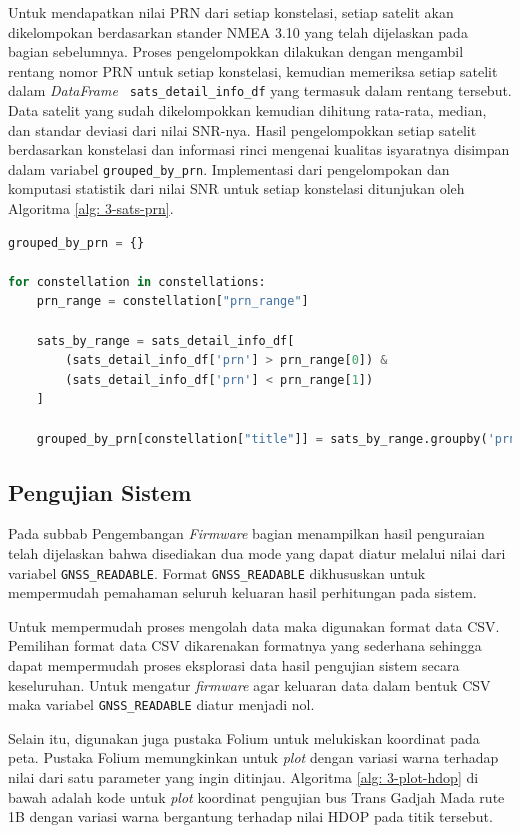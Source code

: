 Untuk mendapatkan nilai PRN dari setiap konstelasi, setiap satelit akan dikelompokan berdasarkan stander NMEA 3.10 yang telah dijelaskan pada bagian sebelumnya. Proses pengelompokkan dilakukan dengan mengambil rentang nomor PRN untuk setiap konstelasi, kemudian memeriksa setiap satelit dalam \textit{DataFrame} \texttt{ sats\_detail\_info\_df} yang termasuk dalam rentang tersebut. Data satelit yang sudah dikelompokkan kemudian dihitung rata-rata, median, dan standar deviasi dari nilai SNR-nya. Hasil pengelompokkan setiap satelit berdasarkan konstelasi dan informasi rinci mengenai kualitas isyaratnya disimpan dalam variabel \texttt{grouped\_by\_prn}. Implementasi dari pengelompokan dan komputasi statistik dari nilai SNR untuk setiap konstelasi ditunjukan oleh Algoritma \ref{alg: 3-sats-prn}.

\vspace{0.3cm}
\begin{lstlisting}[language=python, style=mystyle, caption={Mengelompokan Satelit Berdasarkan PRN-nya pada Python}, label={lst: 3-sats-prn}]
grouped_by_prn = {}

for constellation in constellations:
	prn_range = constellation["prn_range"]
	
	sats_by_range = sats_detail_info_df[
		(sats_detail_info_df['prn'] > prn_range[0]) & 
		(sats_detail_info_df['prn'] < prn_range[1])
	]
	
	grouped_by_prn[constellation["title"]] = sats_by_range.groupby('prn')['snr'].agg(['mean', 'median', 'std'])
\end{lstlisting}
\fi

\subsection{Pengujian Sistem}
Pada subbab Pengembangan \textit{Firmware} bagian menampilkan hasil penguraian telah dijelaskan bahwa disediakan dua mode yang dapat diatur melalui nilai dari variabel \texttt{GNSS\_READABLE}. Format \texttt{GNSS\_READABLE} dikhususkan untuk mempermudah pemahaman seluruh keluaran hasil perhitungan pada sistem.

Untuk mempermudah proses mengolah data maka digunakan format data CSV. Pemilihan format data CSV dikarenakan formatnya yang sederhana sehingga dapat mempermudah proses eksplorasi data hasil pengujian sistem secara keseluruhan. Untuk mengatur \textit{firmware} agar keluaran data dalam bentuk CSV maka variabel \texttt{GNSS\_READABLE} diatur menjadi nol.

Selain itu, digunakan juga pustaka Folium untuk melukiskan koordinat pada peta. Pustaka Folium memungkinkan untuk \textit{plot} dengan variasi warna terhadap nilai dari satu parameter yang ingin ditinjau. Algoritma \ref{alg: 3-plot-hdop} di bawah adalah kode untuk \textit{plot} koordinat pengujian bus Trans Gadjah Mada rute 1B dengan variasi warna bergantung terhadap nilai HDOP pada titik tersebut.

